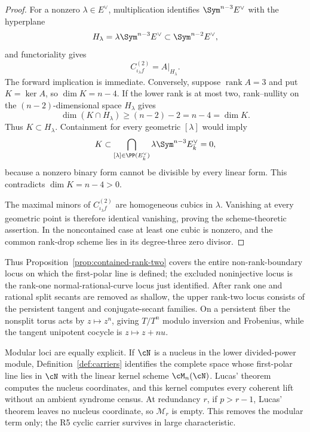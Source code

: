 \begin{proof}
For a nonzero $\lambda\in E^\vee$, multiplication identifies
$\Sym^{n-3}E^\vee$ with the hyperplane
\[
 H_\lambda=\lambda\Sym^{n-3}E^\vee\subset\Sym^{n-2}E^\vee,
\]
and functoriality gives
\[
 C_{\iota_\lambda f}^{(2)}=A|_{H_\lambda}.
\]
The forward implication is immediate.  Conversely, suppose
$\operatorname{rank}A=3$ and put $K=\ker A$, so
$\dim K=n-4$.  If the lower rank is at most two, rank--nullity on the
$(n-2)$-dimensional space $H_\lambda$ gives
\[
 \dim(K\cap H_\lambda)\geq(n-2)-2=n-4=\dim K.
\]
Thus $K\subset H_\lambda$.  Containment for every geometric
$[\lambda]$ would imply
\[
 K\subset\bigcap_{[\lambda]\in\PP(E^\vee_{\bar k})}
 \lambda\Sym^{n-3}E^\vee_{\bar k}=0,
\]
because a nonzero binary form cannot be divisible by every linear
form.  This contradicts $\dim K=n-4>0$.

The maximal minors of $C_{\iota_\lambda f}^{(2)}$ are homogeneous
cubics in $\lambda$.  Vanishing at every geometric point is therefore
identical vanishing, proving the scheme-theoretic assertion.  In the
noncontained case at least one cubic is nonzero, and the common
rank-drop scheme lies in its degree-three zero divisor.
\end{proof}

Thus Proposition~\ref{prop:contained-rank-two} covers the entire
non-rank-boundary locus on which the first-polar line is defined; the
excluded noninjective locus is the rank-one normal-rational-curve
locus just identified.  After rank one and rational split secants are removed as shallow, the
upper rank-two locus consists of the persistent tangent and
conjugate-secant families.  On a persistent fiber the nonsplit torus
acts by $z\mapsto z^n$, giving $T/T^n$ modulo inversion and Frobenius,
while the tangent unipotent cocycle is $z\mapsto z+nu$.

Modular loci are equally explicit.  If $\cN$ is a nucleus in the
lower divided-power module, Definition~\ref{def:carriers} identifies
the complete space whose first-polar line lies in \(\cN\) with the
linear kernel scheme \(\cM_n(\cN)\).  Lucas' theorem computes the
nucleus coordinates, and this kernel computes every coherent lift
without an ambient syndrome census.
At redundancy \(r\), if \(p>r-1\), Lucas' theorem leaves no nucleus
coordinate, so \(\mathcal M_r\) is empty.  This removes the modular
term only; the R5 cyclic carrier survives in large characteristic.
